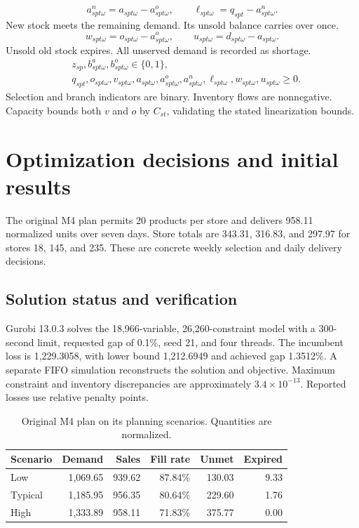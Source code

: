 \documentclass[11pt,letterpaper]{article}
\begin{document}
\begin{equation}
a^n_{spt\omega}=a_{spt\omega}-a^o_{spt\omega},\qquad
\ell_{spt\omega}=q_{spt}-a^n_{spt\omega}.
\end{equation}
New stock meets the remaining demand. Its unsold balance carries over once.
\begin{equation}
w_{spt\omega}=o_{spt\omega}-a^o_{spt\omega},\qquad
u_{spt\omega}=d_{spt\omega}-a_{spt\omega}.
\end{equation}
Unsold old stock expires. All unserved demand is recorded as shortage.
\begin{equation}
\begin{aligned}
&z_{sp},b^a_{spt\omega},b^o_{spt\omega}\in\{0,1\},\\
&q_{spt},o_{spt\omega},v_{spt\omega},a_{spt\omega},a^o_{spt\omega},
a^n_{spt\omega},\ell_{spt\omega},w_{spt\omega},u_{spt\omega}\geq0.
\end{aligned}
\end{equation}
Selection and branch indicators are binary. Inventory flows are nonnegative.
Capacity bounds both $v$ and $o$ by $C_{st}$, validating the stated
linearization bounds.

\clearpage

\section{Optimization decisions and initial results}
The original M4 plan permits 20 products per store and delivers 958.11 normalized
units over seven days. Store totals are 343.31, 316.83, and 297.97 for stores 18,
145, and 235. These are concrete weekly selection and daily delivery decisions.

\subsection{Solution status and verification}
Gurobi 13.0.3 solves the 18,966-variable, 26,260-constraint model with a
300-second limit, requested gap of 0.1\%, seed 21, and four threads.
The incumbent loss is 1,229.3058, with lower bound 1,212.6949 and achieved gap
1.3512\%. A separate FIFO simulation reconstructs the solution and objective.
Maximum constraint and inventory discrepancies are approximately
$3.4\times10^{-13}$. Reported losses use relative penalty points.

\begin{table}[H]\centering
\caption{Original M4 plan on its planning scenarios. Quantities are normalized.}
\begin{tabular}{lrrrrr}\toprule
Scenario & Demand & Sales & Fill rate & Unmet & Expired\\\midrule
Low & 1,069.65 & 939.62 & 87.84\% & 130.03 & 9.33\\
Typical & 1,185.95 & 956.35 & 80.64\% & 229.60 & 1.76\\
High & 1,333.89 & 958.11 & 71.83\% & 375.77 & 0.00\\\bottomrule
\end{tabular}\end{table}
\end{document}

